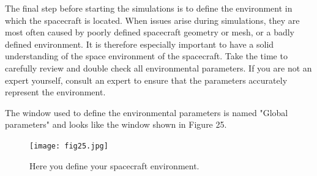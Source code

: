 \documentclass[a4paper, 11pt]{article}
\begin{document}
The final step before starting the simulations is to define the environment in which the spacecraft is located. When issues arise during simulations, they are most often caused by poorly defined spacecraft geometry or mesh, or a badly defined environment. It is therefore especially important to have a solid understanding of the space environment of the spacecraft. Take the time to carefully review and double check all environmental parameters. If you are not an expert yourself, consult an expert to ensure that the parameters accurately represent the environment.\par
The window used to define the environmental parameters is named "Global parameters" and looks like the window shown in Figure 25.

\begin{figure}[!ht]
    \centering
    \texttt{[image: fig25.jpg]}
    \caption{Here you define your spacecraft environment.}
\end{figure}
\end{document}

